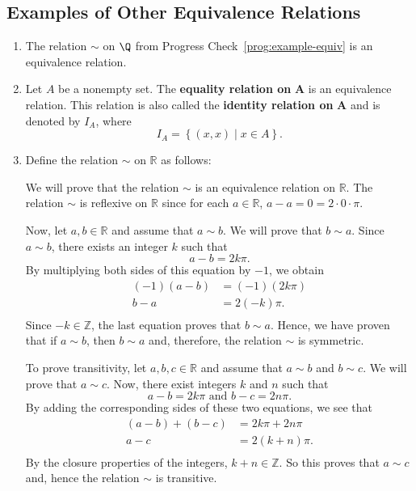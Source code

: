 \subsection*{Examples of Other Equivalence Relations}
\begin{enumerate}
\item The relation $\sim$ on $\Q$ from Progress Check~\ref{prog:example-equiv} is an equivalence relation.


\item Let  $A$  be a nonempty set.  The \textbf{equality relation on}
%
%
%
%
  $\boldsymbol{A}$  is an equivalence relation.  This relation is also called the \textbf{identity relation on}  $\boldsymbol{A}$    and is denoted by  $I_A $, where
\[
I_A  = \left\{ {\left( {x, x} \right)   \mid x \in A} \right\}\!.
\]

\item Define the relation  $\sim$  on  $\mathbb{R}$  as follows:

\vskip10pt

We will prove that the relation  $\sim$  is an equivalence relation on  $\mathbb{R}$.  The relation  $\sim$  is reflexive on  $\mathbb{R}$ since for each  $a \in \mathbb{R}$,  
$a - a = 0 = 2 \cdot 0 \cdot \pi $.

Now, let  $a, b \in \mathbb{R}$ and assume that  $a \sim b$.  We will prove that  $b \sim a$.  Since  $a \sim b$, there exists an integer  $k$  such that
\[
a - b = 2k\pi.
\]
By multiplying both sides of this equation by $-1$, we obtain
\[
\begin{aligned}
  ( { - 1} )( {a - b} ) &= ( { - 1} )( {2k\pi } ) \\ 
                  b - a &= 2( { - k} )\pi . \\ 
\end{aligned}
\]
Since  $ - k \in \mathbb{Z}$, the last equation proves that  $b \sim a$.  Hence, we have proven that if  $a \sim b$, then  $b \sim a$ and, therefore, the relation  $\sim$  is symmetric.

To prove transitivity, let  $a, b, c \in \mathbb{R}$ and assume that  $a \sim b$ and  
$b \sim c$.  We will prove that  $a \sim c$.  Now, there exist integers  $k$  and  $n$  such that
\[
a - b = 2k\pi \text{  and  }b - c = 2n\pi .
\]
By adding the corresponding sides of these two equations, we see that
\[
\begin{aligned}
( {a - b} ) + ( {b - c} ) &= 2k\pi  + 2n\pi  \\ 
                    a - c &= 2( {k + n} )\pi . \\ 
\end{aligned} 
\]
By the closure properties of the integers,  $k + n \in \mathbb{Z}$.  So this proves that  
$a \sim c$ and, hence the relation  $\sim$  is transitive.


\end{enumerate}
